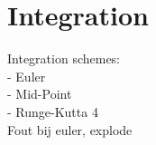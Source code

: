 \section{Integration}

Integration schemes:\\
- Euler\\
- Mid-Point\\
- Runge-Kutta 4\\
Fout bij euler, explode\\
